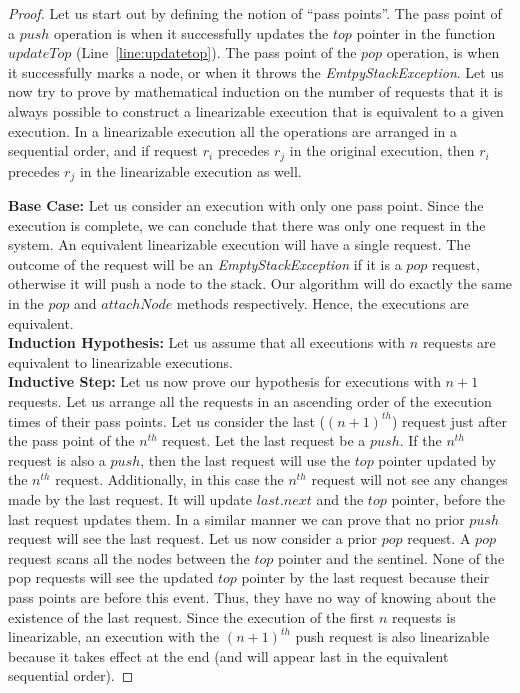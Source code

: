 \documentclass{llncs}
\begin{document}
\begin{proof}
Let us start out by defining the notion of ``pass points''. The pass point of a $push$ 
operation is when it successfully updates the $top$ pointer in the function $updateTop$
(Line~\ref{line:updatetop}). The pass point of the $pop$ operation, is when it successfully marks a node,
or when it throws the {\em EmtpyStackException}.
Let us now try to prove by mathematical
induction on the number of requests
that it is always possible to construct a linearizable execution that is equivalent to
a given execution. In a linearizable execution all the operations are arranged in a sequential
order, and if request $r_i$ precedes $r_j$ in the original execution, then $r_i$ precedes $r_j$
in the linearizable execution as well.

\noindent \textbf{Base Case:} Let us consider an execution with only one pass point. Since
the execution is complete, we can conclude that there was only one request in the system.
An equivalent linearizable execution will have a single request. The outcome of the request
will be an {\em EmptyStackException} if it is a $pop$ request, otherwise it will push a node
to the stack. Our algorithm will do exactly the same in the $pop$ and $attachNode$ methods
respectively. Hence, the executions are equivalent. \\
\noindent \textbf{Induction Hypothesis:} Let us assume that all executions with $n$ requests
are equivalent to linearizable executions. \\
\noindent \textbf{Inductive Step:} Let us now prove our hypothesis for executions with $n+1$
requests. Let us arrange all the requests in an ascending order of the execution times 
of their pass points. Let us consider the last ($(n+1)^{th}$) request just after the pass point of the
$n^{th}$ request. Let the last request be a $push$. If the $n^{th}$ request is also a $push$, 
then the last request will use the $top$ pointer updated
by the $n^{th}$ request. Additionally, in this case 
the $n^{th}$ request will not see any changes made by the
last request. It will update $last.next$ and the $top$ pointer, before the last request updates
them. In a similar manner we can prove that no prior $push$ request will see the last request.
Let us now consider a prior $pop$ request. A $pop$ request scans all the nodes between the
$top$ pointer and the sentinel. None of the pop requests will see the updated $top$ pointer
by the last request because their pass points are before this event. Thus, they have no
way of knowing about the existence of the last request. Since the execution of the first $n$
requests is linearizable, an execution with the $(n+1)^{th}$ push request is also linearizable
because it takes effect at the end (and will appear last in the equivalent sequential order). 


\end{proof}
\end{document}
